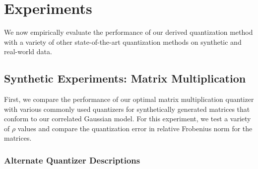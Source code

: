 \documentclass{article}
\begin{document}

\section{Experiments}\label{sec:Exps}

We now empirically evaluate the performance of our derived quantization method with a variety of other state-of-the-art quantization methods on synthetic and real-world data.

\subsection{Synthetic Experiments: Matrix Multiplication}

First, we compare the performance of our optimal matrix multiplication quantizer with various commonly used quantizers for synthetically generated matrices that conform to our correlated Gaussian model. For this experiment, we test a variety of $\rho$ values and compare the quantization error in relative Frobenius norm for the matrices. 

\subsubsection{Alternate Quantizer Descriptions}
\end{document}
